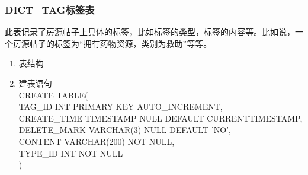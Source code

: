 \subsubsection{DICT\_TAG标签表}
此表记录了房源帖子上具体的标签，比如标签的类型，标签的内容等。比如说，一个房源帖子的标签为“拥有药物资源，类别为救助”等等。
\begin{enumerate}
    \item 表结构
    \begin{table}[htbp]
        \centering
        \end{table}
    \item 建表语句\\
        CREATE TABLE(\\
            TAG\_ID INT PRIMARY KEY AUTO\_INCREMENT,\\
            CREATE\_TIME TIMESTAMP NULL DEFAULT CURRENTTIMESTAMP,\\
            DELETE\_MARK VARCHAR(3) NULL DEFAULT 'NO',\\
            CONTENT VARCHAR(200) NOT NULL,\\
            TYPE\_ID INT NOT NULL\\
        )
    \end{enumerate}

